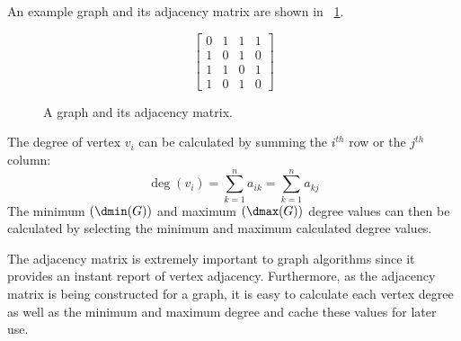 An example graph and its adjacency matrix are shown in \figurename~\ref{fig:adjacency}.

\begin{figure}[H]
  \begin{minipage}{2.5in}
    \centering
  \end{minipage}
  \begin{minipage}{2.5in}
    \centering
    \[\begin{bmatrix}
      0 & 1 & 1 & 1 \\
      1 & 0 & 1 & 0 \\
      1 & 1 & 0 & 1 \\
      1 & 0 & 1 & 0
    \end{bmatrix}\]
  \end{minipage}
  \caption{A graph and its adjacency matrix.}
  \label{fig:adjacency}
\end{figure}

The degree of vertex \(v_i\) can be calculated by summing the \(i^{th}\) row or the \(j^{th}\) column:
\[\deg(v_i)=\sum_{k=1}^na_{ik}=\sum_{k=1}^na_{kj}\]
The minimum \((\dmin(G))\) and maximum \((\dmax(G))\) degree values can then be calculated by selecting the minimum
and maximum calculated degree values.

The adjacency matrix is extremely important to graph algorithms since it provides an instant report of vertex
adjacency.  Furthermore, as the adjacency matrix is being constructed for a graph, it is easy to calculate each
vertex degree as well as the minimum and maximum degree and cache these values for later use.
